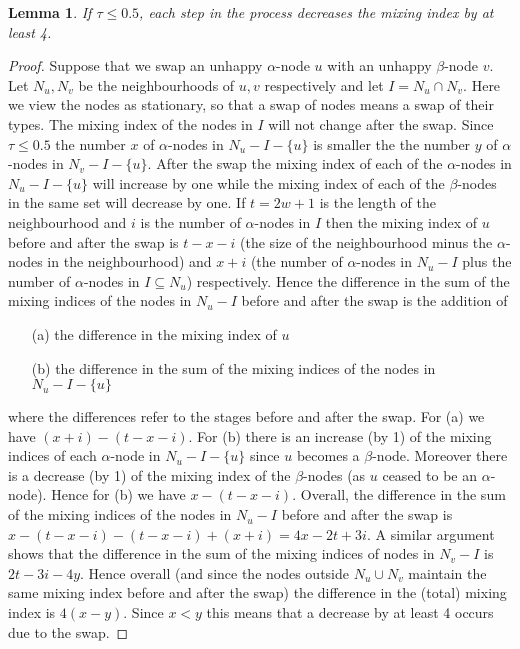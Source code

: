 \documentclass[11pt]{article}
\theoremstyle{plain}
\newtheorem{lem}[thm]{Lemma}
\numberwithin{equation}{subsection}
\begin{document}
\begin{lem}
If $\tau\leq 0.5$, each step in the process
decreases the mixing index by at least 4.
\end{lem}
\begin{proof}
Suppose that we swap an unhappy $\alpha$-node $u$
with an unhappy $\beta$-node $v$. 
Let $N_u, N_v$ be the 
neighbourhoods of $u,v$ respectively and let 
$I=N_u\cap N_v$. Here we view the nodes as stationary, so that a swap of nodes
means a swap of their types.
The mixing index of the nodes in 
$I$ will not change after the swap.
Since $\tau\leq 0.5$ the number $x$ of $\alpha$-nodes
in $N_u-I-\{u\}$ is smaller the the number $y$ of $\alpha$-nodes
in $N_v-I-\{u\}$.  After the swap the mixing index of each of the 
$\alpha$-nodes in $N_u-I-\{u\}$ will increase by one while the mixing index
of each of the $\beta$-nodes in the same set will decrease by one.
If $t=2w+1$ is the length of the neighbourhood and $i$ is the number of
$\alpha$-nodes in $I$ then the mixing index of $u$
before and after the swap is $t-x-i$ (the size of the neighbourhood minus the $\alpha$-nodes in the
neighbourhood)  and $x+i$  (the number of $\alpha$-nodes in $N_u-I$ plus the number 
of $\alpha$-nodes in $I\subseteq N_u$) respectively.
Hence the difference in the sum of the mixing indices of the nodes in
$N_u-I$ before and after the swap is the addition of
\begin{itemize}
\item[(a)] the difference in the mixing index of $u$
\item[(b)] the difference in the sum of the mixing indices of the nodes in $N_u-I-\{u\}$
\end{itemize}
where the differences refer to the stages before and after the swap.
For (a) we have $(x+i)-(t-x-i)$. 
For (b) there is an increase (by 1) of the mixing indices of each $\alpha$-node in $N_u-I-\{u\}$
since $u$ becomes a $\beta$-node. Moreover there is a decrease (by 1) of
the mixing index of the $\beta$-nodes (as $u$ ceased to be an $\alpha$-node). Hence
for (b) we have $x-(t-x-i)$. Overall,  the difference in the sum of the mixing indices of the nodes in
$N_u-I$ before and after the swap is
$x-(t-x-i)-(t-x-i)+(x+i)=4x-2t+3i$.
A similar argument shows that the difference in the sum of the mixing indices
of nodes in $N_v-I$ is $2t-3i-4y$. Hence overall (and since the nodes outside 
$N_u\cup N_v$ maintain the same mixing index before and after the swap)
the difference in the (total) mixing index is $4(x-y)$. Since $x<y$ this means that
a decrease by at least 4 occurs due to the swap.
\end{proof}
\end{document}
